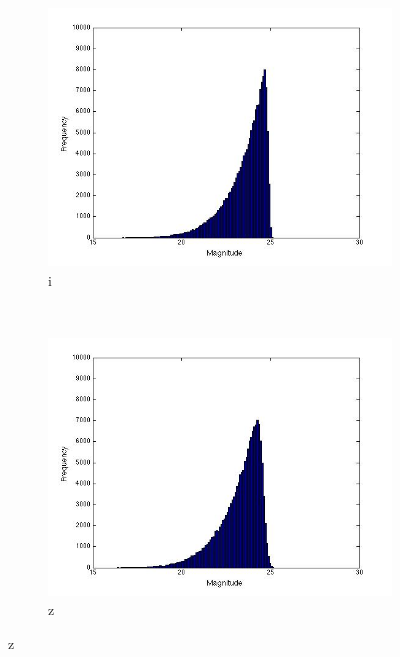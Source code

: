 \documentclass[useAMS,usenatbib,fleqn]{mn2e}
\begin{document}
\begin{figure}
\begin{subfigure}[b]{0.2\textwidth}
                \includegraphics[trim = 35px 15px 50px 25px, clip=true,width=\textwidth]{i.jpg}
                \caption{i}
        \end{subfigure}
         ~
        \begin{subfigure}[b]{0.2\textwidth}
                \includegraphics[trim = 35px 15px 50px 25px, clip=true,width=\textwidth]{z.jpg}
                \caption{z}
        \end{subfigure}
        

\end{figure}
\end{document}
